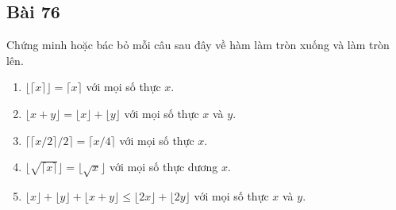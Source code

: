 \subsection*{Bài 76}
Chứng minh hoặc bác bỏ mỗi câu sau đây về hàm làm tròn xuống và làm tròn lên.
\begin{enumerate}[label=\alph*)]
    \item $\lfloor\lceil x\rceil\rfloor=\lceil x\rceil$ với mọi số thực $x$.
    \item $\lfloor x+y\rfloor=\lfloor x\rfloor+\lfloor y\rfloor$ với mọi số thực $x$ và $y$.
    \item $\lceil\lceil x/2\rceil/2\rceil=\lceil x/4\rceil$ với mọi số thực $x$.
    \item $\lfloor\sqrt{\lceil x\rceil}\rfloor=\lfloor\sqrt x\rfloor$ với mọi số thực dương $x$.
    \item $\lfloor x\rfloor+\lfloor y\rfloor+\lfloor x+y\rfloor\leq\lfloor2x\rfloor+\lfloor2y\rfloor$ với mọi số thực $x$ và $y$.
\end{enumerate}
